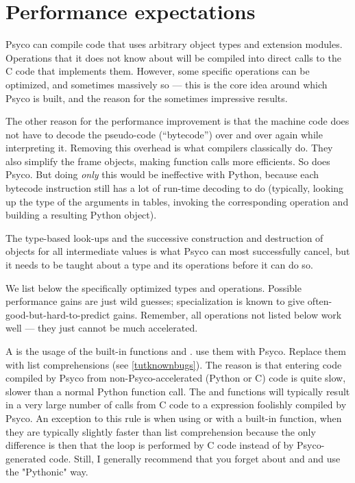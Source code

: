 \documentclass{manual}
\begin{document}
\chapter{Performance expectations}

Psyco can compile code that uses arbitrary object types and extension modules.  Operations that it does not know about will be compiled into direct calls to the C code that implements them.  However, some specific operations can be optimized, and sometimes massively so --- this is the core idea around which Psyco is built, and the reason for the sometimes impressive results.

The other reason for the performance improvement is that the machine code does not have to decode the pseudo-code (``bytecode'') over and over again while interpreting it.  Removing this overhead is what compilers classically do.  They also simplify the frame objects, making function calls more efficients.  So does Psyco.  But doing \emph{only} this would be ineffective with Python, because each bytecode instruction still has a lot of run-time decoding to do (typically, looking up the type of the arguments in tables, invoking the corresponding operation and building a resulting Python object).

The type-based look-ups and the successive construction and destruction of objects for all intermediate values is what Psyco can most successfully cancel, but it needs to be taught about a type and its operations before it can do so.

We list below the specifically optimized types and operations.  Possible performance gains are just wild guesses; specialization is known to give often-good-but-hard-to-predict gains.  Remember, all operations not listed below work well --- they just cannot be much accelerated.

A  is the usage of the built-in functions  and .   use them with Psyco.  Replace them with list comprehensions (see \ref{tutknownbugs}).  The reason is that entering code compiled by Psyco from non-Psyco-accelerated (Python or C) code is quite slow, slower than a normal Python function call.  The  and  functions will typically result in a very large number of calls from C code to a  expression foolishly compiled by Psyco.  An exception to this rule is when using  or  with a built-in function, when they are typically slightly faster than list comprehension because the only difference is then that the loop is performed by C code instead of by Psyco-generated code.  Still, I generally recommend that you forget about  and  and use the "Pythonic" way.
\end{document}
